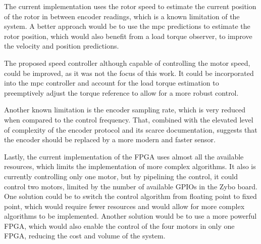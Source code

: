 The current implementation uses the rotor speed to estimate the current position of the rotor in between encoder readings, which is a known limitation of the system. A better approach would be to use the \gls{mpc} predictions to estimate the rotor position, which would also benefit from a load torque observer, to improve the velocity and position predictions.

The proposed speed controller although capable of controlling the motor speed, could be improved, as it was not the focus of this work. It could be incorporated into the \gls{mpc} controller and account for the load torque estimation to preemptively adjust the torque reference to allow for a more robust control.

Another known limitation is the encoder sampling rate, which is very reduced when compared to the control frequency. That, combined with the elevated level of complexity of the encoder protocol and its scarce documentation, suggests that the encoder should be replaced by a more modern and faster sensor.

Lastly, the current implementation of the FPGA uses almost all the available resources, which limits the implementation of more complex algorithms. It also is currently controlling only one motor, but by pipelining the control, it could control two motors, limited by the number of available GPIOs in the Zybo board. One solution could be to switch the control algorithm from floating point to fixed point, which would require fewer resources and would allow for more complex algorithms to be implemented. Another solution would be to use a more powerful FPGA, which would also enable the control of the four motors in only one FPGA, reducing the cost and volume of the system.